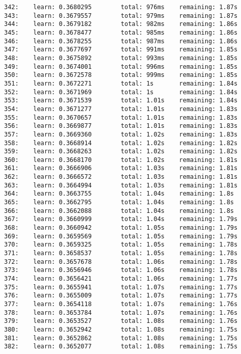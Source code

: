 \documentclass[11pt]{article}
\begin{document}
\begin{Verbatim}[commandchars=\\\{\}]
342:    learn: 0.3680295        total: 976ms    remaining: 1.87s
343:    learn: 0.3679557        total: 979ms    remaining: 1.87s
344:    learn: 0.3679182        total: 982ms    remaining: 1.86s
345:    learn: 0.3678477        total: 985ms    remaining: 1.86s
346:    learn: 0.3678255        total: 987ms    remaining: 1.86s
347:    learn: 0.3677697        total: 991ms    remaining: 1.85s
348:    learn: 0.3675892        total: 993ms    remaining: 1.85s
349:    learn: 0.3674001        total: 996ms    remaining: 1.85s
350:    learn: 0.3672578        total: 999ms    remaining: 1.85s
351:    learn: 0.3672271        total: 1s       remaining: 1.84s
352:    learn: 0.3671969        total: 1s       remaining: 1.84s
353:    learn: 0.3671539        total: 1.01s    remaining: 1.84s
354:    learn: 0.3671277        total: 1.01s    remaining: 1.83s
355:    learn: 0.3670657        total: 1.01s    remaining: 1.83s
356:    learn: 0.3669877        total: 1.01s    remaining: 1.83s
357:    learn: 0.3669360        total: 1.02s    remaining: 1.83s
358:    learn: 0.3668914        total: 1.02s    remaining: 1.82s
359:    learn: 0.3668263        total: 1.02s    remaining: 1.82s
360:    learn: 0.3668170        total: 1.02s    remaining: 1.81s
361:    learn: 0.3666906        total: 1.03s    remaining: 1.81s
362:    learn: 0.3666572        total: 1.03s    remaining: 1.81s
363:    learn: 0.3664994        total: 1.03s    remaining: 1.81s
364:    learn: 0.3663755        total: 1.04s    remaining: 1.8s
365:    learn: 0.3662795        total: 1.04s    remaining: 1.8s
366:    learn: 0.3662088        total: 1.04s    remaining: 1.8s
367:    learn: 0.3660999        total: 1.04s    remaining: 1.79s
368:    learn: 0.3660942        total: 1.05s    remaining: 1.79s
369:    learn: 0.3659569        total: 1.05s    remaining: 1.79s
370:    learn: 0.3659325        total: 1.05s    remaining: 1.78s
371:    learn: 0.3658537        total: 1.05s    remaining: 1.78s
372:    learn: 0.3657678        total: 1.06s    remaining: 1.78s
373:    learn: 0.3656946        total: 1.06s    remaining: 1.78s
374:    learn: 0.3656421        total: 1.06s    remaining: 1.77s
375:    learn: 0.3655941        total: 1.07s    remaining: 1.77s
376:    learn: 0.3655009        total: 1.07s    remaining: 1.77s
377:    learn: 0.3654118        total: 1.07s    remaining: 1.76s
378:    learn: 0.3653784        total: 1.07s    remaining: 1.76s
379:    learn: 0.3653527        total: 1.08s    remaining: 1.76s
380:    learn: 0.3652942        total: 1.08s    remaining: 1.75s
381:    learn: 0.3652862        total: 1.08s    remaining: 1.75s
382:    learn: 0.3652077        total: 1.08s    remaining: 1.75s

\end{Verbatim}
\end{document}
